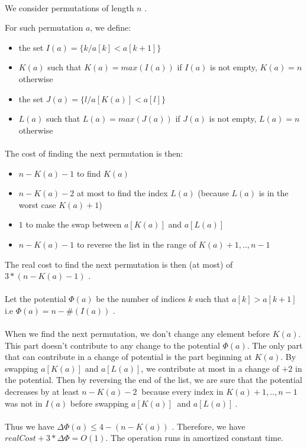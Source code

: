 

\paragraph{}
We consider permutations of length $n$ .

For such permutation $a$, we define:
\begin{itemize}
\item{} the set $I(a)=\{k/ a[k]<a[k+1]\}$
\item{} $K(a)$ such that $K(a)= max(I(a))$ if $I(a)$ is not empty, $K(a)=n$ otherwise
\item{} the set $J(a)=\{l/ a[K(a)]<a[l]\}$
\item{} $L(a)$ such that $L(a) = max(J(a))$ if $J(a)$ is not empty, $L(a)=n$ otherwise
\end{itemize}

\paragraph{}
The cost of finding the next permutation is then:
\begin{itemize}
\item{} $n-K(a)-1$ to find $K(a)$
\item{} $n-K(a)-2$ at most to find the index $L(a)$ (because $L(a)$ is in the worst case $K(a)+1$)
\item{} $1$ to make the swap between $a[K(a)]$ and $a[L(a)]$
\item{} $n-K(a)-1$ to reverse the list in the range of $K(a)+1,..,n-1$
\end{itemize}
The real cost to find the next permutation is then (at most) of $3*(n-K(a)-1)$ .

\paragraph{}
Let the potential $\Phi(a)$ be the number of indices $k$ such that $a[k]>a[k+1]$
\newline
i.e $\Phi(a)=n-\#(I(a))$ .

\paragraph{}
When we find the next permutation, we don't change any element before $K(a)$. This part doesn't contribute to any change to the potential $\Phi(a)$. The only part that can contribute in a change of potential is the part beginning at $K(a)$.
\newline
By swapping $a[K(a)]$ and $a[L(a)]$, we contribute at most in a change of $+2$ in the potential. Then by reversing the end of the list, we are sure that the potential decreases by at least $n-K(a)-2\ $ because every index in $K(a)+1,..,n-1$ was not in $I(a)$ before swapping $a[K(a)]\ $ and $a[L(a)]\ $.
\paragraph{}
Thus we have $\Delta\Phi(a)\leq{4-(n-K(a))}$ .
\newline
Therefore, we have $realCost+3*\Delta\Phi=O(1)$. The operation runs in amortized constant time.